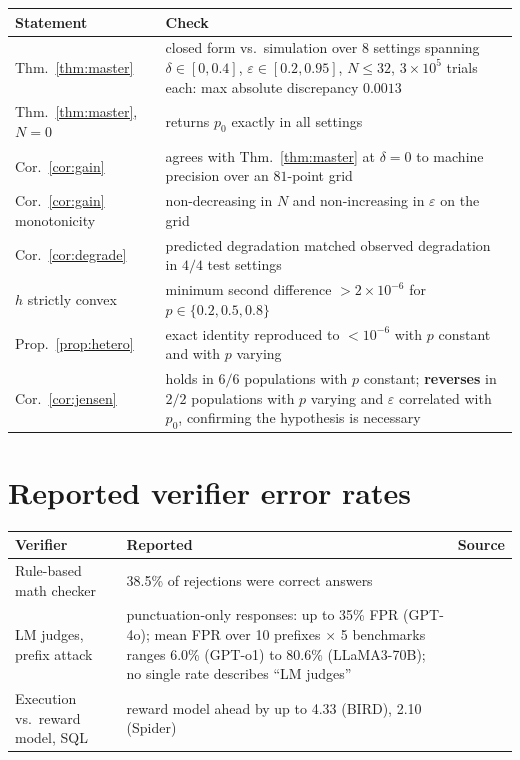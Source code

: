 \documentclass[11pt]{article}
\begin{document}
\begin{center}\small
\begin{tabular}{@{}p{3.2cm}p{4.2cm}@{}}
\toprule
Statement & Check \\
\midrule
Thm.~\ref{thm:master} & closed form vs.\ simulation over 8 settings spanning $\delta\in[0,0.4]$, $\varepsilon\in[0.2,0.95]$, $N\le32$, $3\times10^5$ trials each: max absolute discrepancy $0.0013$ \\[2pt]
Thm.~\ref{thm:master}, $N{=}0$ & returns $p_0$ exactly in all settings \\[2pt]
Cor.~\ref{cor:gain} & agrees with Thm.~\ref{thm:master} at $\delta=0$ to machine precision over an $81$-point grid \\[2pt]
Cor.~\ref{cor:gain} monotonicity & non-decreasing in $N$ and non-increasing in $\varepsilon$ on the grid \\[2pt]
Cor.~\ref{cor:degrade} & predicted degradation matched observed degradation in $4/4$ test settings \\[2pt]
$h$ strictly convex & minimum second difference $>2\times10^{-6}$ for $p\in\{0.2,0.5,0.8\}$ \\[2pt]
Prop.~\ref{prop:hetero} & exact identity reproduced to $<10^{-6}$ with $p$ constant and with $p$ varying \\[2pt]
Cor.~\ref{cor:jensen} & holds in $6/6$ populations with $p$ constant; \textbf{reverses} in $2/2$ populations with $p$ varying and $\varepsilon$ correlated with $p_0$, confirming the hypothesis is necessary \\
\bottomrule
\end{tabular}
\end{center}

\section{Reported verifier error rates}\label{app:lit}
\begin{table}[t]\centering\small
\setlength{\tabcolsep}{3pt}
\begin{tabular}{@{}p{2.55cm}p{2.25cm}p{2.3cm}@{}}
\toprule
Verifier & Reported & Source \\
\midrule
Rule-based math checker & 38.5\% of rejections were correct answers & \citep{tinyv2025} \\[2pt]
LM judges, prefix attack & punctuation-only responses: up to 35\% FPR (GPT-4o); mean FPR over 10 prefixes $\times$ 5 benchmarks ranges 6.0\% (GPT-o1) to 80.6\% (LLaMA3-70B); no single rate describes ``LM judges'' & \citep{onetoken2025} \\[2pt]
Execution vs.\ reward model, SQL & reward model ahead by up to 4.33 (BIRD), 2.10 (Spider) & \citep{gradesql2026} \\
\bottomrule
\end{tabular}
\label{tab:lit}
\end{table}
\end{document}
